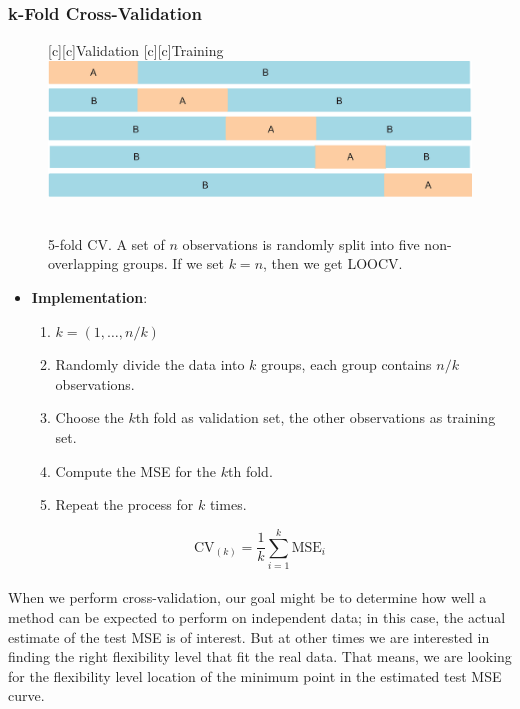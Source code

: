 \documentclass[12pt,a4paper]{article}%
\theoremstyle{definition}
\theoremstyle{plain}
\numberwithin{equation}{section}
\begin{document}
\subsubsection{\textbf{k-Fold Cross-Validation}}
\begin{figure}[H]
\centering
{}[c][c]{Validation}
[c][c]{Training}
\includegraphics[scale=1]{images//5_5.eps}
\\~\\
\caption{5-fold CV. A set of $n$ observations is randomly split into five non-overlapping groups. If we set $k = n$, then we get LOOCV.}\label{figure-5.5}
\end{figure}

\begin{itemize}
\item \textbf{Implementation}:
	\begin{enumerate}
	\item $k=(1,\dots,n/k)$
	\item Randomly divide the data into $k$ groups, each group contains $n/k$ observations.
	\item Choose the $k$th fold as validation set, the other observations as training set.
	\item Compute the MSE for the $k$th fold.
	\item Repeat the process for $k$ times. 
	\end{enumerate}
\end{itemize}

\begin{equation*}
\text{CV}_{(k)}=\frac{1}{k}\sum\limits_{i=1}^{k} \text{MSE}_{i}
\end{equation*}
~\\
When we perform cross-validation, our goal might be to determine how well a method can be expected to perform on independent data; in this case, the actual estimate of the test MSE is of interest.
But at other times we are interested in finding the right flexibility level that fit the real data.
That means, we are looking for the flexibility level location of the minimum point in the estimated test MSE curve.
\end{document}
